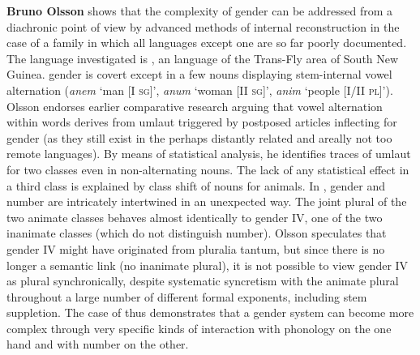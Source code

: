 \documentclass[output=collectionpaper]{langsci/langscibook}
\begin{document}
\textbf{Bruno Olsson} shows that the complexity of gender can be addressed from a diachronic point of view by advanced methods of internal reconstruction in the case of a family in which all languages except one are so far poorly documented. The language investigated is , an  language of the Trans-Fly area of South New Guinea.  gender is covert except in a few nouns displaying stem-internal vowel alternation (\textit{anem} ‘man [I \textsc{sg}]’, \textit{anum} ‘woman [II \textsc{sg}]’, \textit{anim} ‘people [I/II \textsc{pl}]’). Olsson endorses earlier comparative research arguing that vowel alternation within  words derives from umlaut triggered by postposed articles inflecting for gender (as they still exist in the perhaps distantly related and areally not too remote  languages). By means of statistical analysis, he identifies traces of umlaut for two classes even in non-alternating nouns. The lack of any statistical effect in a third class is explained by class shift of nouns for animals. In , gender and number are intricately intertwined in an unexpected way. The joint plural of the two animate classes behaves almost identically to gender IV, one of the two inanimate classes (which do not distinguish number). Olsson speculates that gender IV might have originated from pluralia tantum, but since there is no longer a semantic link (no inanimate plural), it is not possible to view gender IV as plural synchronically, despite systematic syncretism with the animate plural throughout a large number of different formal exponents, including stem suppletion. The case of  thus demonstrates that a gender system can become more complex through very specific kinds of interaction with phonology on the one hand and with number on the other.
\end{document}
